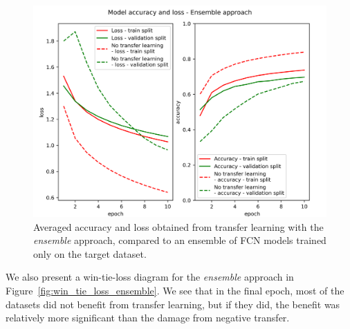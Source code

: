 \documentclass[a4paper,11pt,twoside]{report}
\theoremstyle{definition}
\begin{document}
\FloatBarrier

\begin{figure}[h!t]
\centering
\includegraphics[width=17 cm]{imgs/ensemble/loss_acc.png}
\caption{Averaged accuracy and loss obtained from transfer learning with the \textit{ensemble} approach, compared to an ensemble of FCN models trained only on the target dataset.}
\label{fig:ensemble_acc}
\end{figure}
\FloatBarrier
We also present a win-tie-loss diagram for the \textit{ensemble} approach in Figure~\ref{fig:win_tie_loss_ensemble}. We see that in the final epoch, most of the datasets did not benefit from transfer learning, but if they did, the benefit was relatively more significant than the damage from negative transfer.
\end{document}
